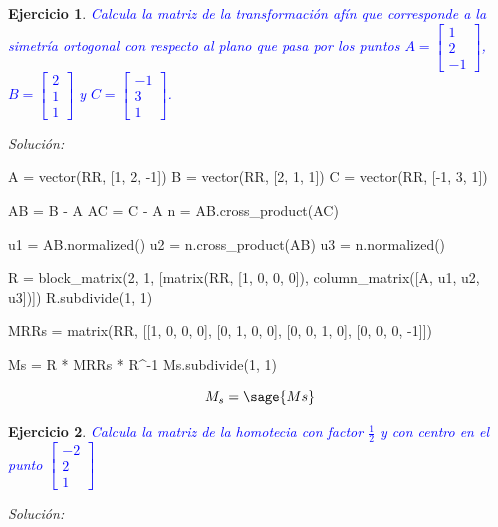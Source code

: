 \documentclass{amsart}
\newtheorem{ejer}{Ejercicio}
\begin{document}
\newpage

\begin{ejer}
\textcolor{blue}{Calcula la matriz de la transformación afín que corresponde a la simetría ortogonal con respecto al plano que pasa por los puntos $A = \left[ \begin{array}{r} 1 \\ 2 \\ -1 \end{array} \right]$, $B = \left[ \begin{array}{r} 2 \\ 1 \\ 1 \end{array} \right]$ y $C = \left[ \begin{array}{r} -1 \\ 3 \\ 1 \end{array} \right]$.}
\end{ejer}

{\it Solución:}

\begin{sageblock}
A = vector(RR, [1, 2, -1])
B = vector(RR, [2, 1, 1])
C = vector(RR, [-1, 3, 1])

AB = B - A
AC = C - A
n = AB.cross_product(AC)

u1 = AB.normalized()
u2 = n.cross_product(AB)
u3 = n.normalized()

R = block_matrix(2, 1, [matrix(RR, [1, 0, 0, 0]), column_matrix([A, u1, u2, u3])])
R.subdivide(1, 1)

MRRs = matrix(RR, [[1, 0, 0, 0], [0, 1, 0, 0], [0, 0, 1, 0], [0, 0, 0, -1]])

Ms = R * MRRs * R^-1
Ms.subdivide(1, 1)
\end{sageblock}

$$
	M_s = \sage{Ms}
$$


\newpage

\begin{ejer}
\textcolor{blue}{Calcula la matriz de la homotecia con factor $\frac{1}{2}$ y con centro en el punto $\left[ \begin{array}{r} -2 \\ 2 \\ 1 \end{array} \right]$}
\end{ejer}

{\it Solución:}

\end{document}
